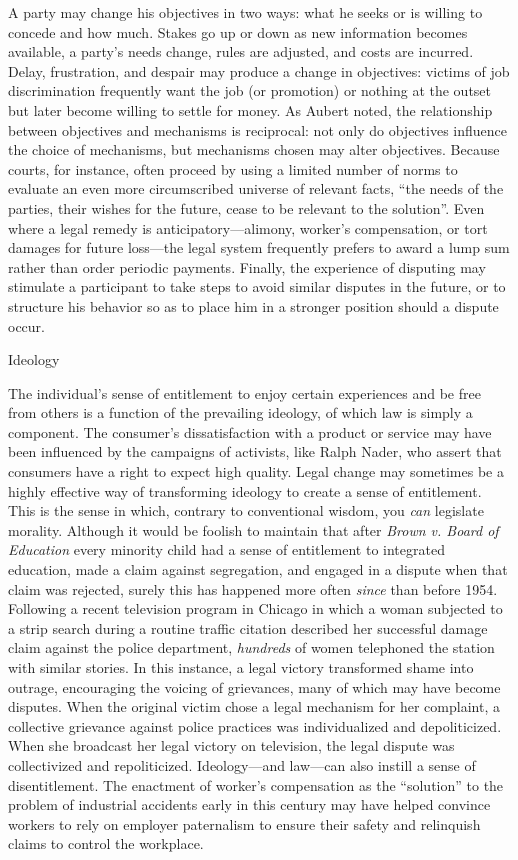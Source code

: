 \documentclass[11pt,letterpaper,twoside]{article}
\begin{document}
A party may change his objectives in two ways: what he seeks or is
willing to concede and how much. Stakes go up or down as new information
becomes available, a party's needs change, rules are adjusted, and costs
are incurred. Delay, frustration, and despair may produce a change in
objectives: victims of job discrimination frequently want the job (or
promotion) or nothing at the outset but later become willing to settle
for money. As Aubert noted, the relationship between objectives and
mechanisms is reciprocal: not only do objectives influence the choice of
mechanisms, but mechanisms chosen may alter objectives. Because courts,
for instance, often proceed by using a limited number of norms to
evaluate an even more circumscribed universe of relevant facts, ``the
needs of the parties, their wishes for the future, cease to be relevant
to the solution''. Even where a legal remedy is anticipatory---alimony,
worker's compensation, or tort damages for future loss---the legal
system frequently prefers to award a lump sum rather than order periodic
payments. Finally, the experience of disputing may stimulate a
participant to take steps to avoid similar disputes in the future, or to
structure his behavior so as to place him in a stronger position should
a dispute occur.

{Ideology}

The individual's sense of entitlement to enjoy certain experiences and
be free from others is a function of the prevailing ideology, of which
law is simply a component. The consumer's dissatisfaction with a product
or service may have been influenced by the campaigns of activists, like
Ralph Nader, who assert that consumers have a right to expect high
quality. Legal change may sometimes be a highly effective way of
transforming ideology to create a sense of entitlement. This is the
sense in which, contrary to conventional wisdom, you \emph{can}
legislate morality. Although it would be foolish to maintain that after
\emph{Brown v. Board of Education} every minority child had a sense of
entitlement to integrated education, made a claim against segregation,
and engaged in a dispute when that claim was rejected, surely this has
happened more often \emph{since} than before 1954. Following a recent
television program in Chicago in which a woman subjected to a strip
search during a routine traffic citation described her successful damage
claim against the police department, \emph{hundreds} of women telephoned
the station with similar stories. In this instance, a legal victory
transformed shame into outrage, encouraging the voicing of grievances,
many of which may have become disputes. When the original victim chose a
legal mechanism for her complaint, a collective grievance against police
practices was individualized and depoliticized. When she broadcast her
legal victory on television, the legal dispute was collectivized and
repoliticized. Ideology---and law---can also instill a sense of
disentitlement. The enactment of worker's compensation as the
``solution'' to the problem of industrial accidents early in this
century may have helped convince workers to rely on employer paternalism
to ensure their safety and relinquish claims to control the workplace.
\end{document}
